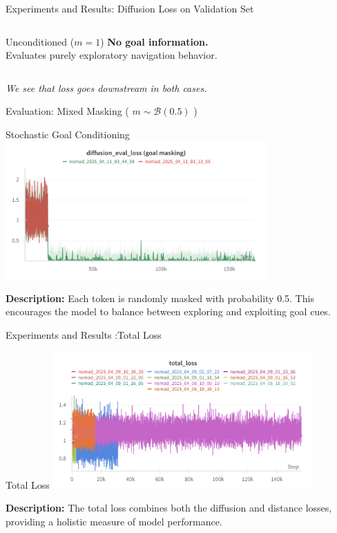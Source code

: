 \documentclass{beamer}
\begin{document}
\begin{frame}{Experiments and Results: Diffusion Loss on Validation Set}
\begin{columns}
\begin{column}{0.48\textwidth}
\begin{block}{\centering Unconditioned ($m = 1$)}
                    \vspace{0.5em}
                    \tiny \textbf{No goal information.} \\
                    Evaluates purely exploratory navigation behavior.
                \end{block}
            \end{column}
        \end{columns}
        
        \vspace{0.7em}
        \centering
        \small \textit{We see that loss goes downstream in both cases.}
    \end{frame}

    \begin{frame}{Evaluation: Mixed Masking ( $m \sim \mathcal{B}(0.5)$ )}
        \begin{block}{Stochastic Goal Conditioning}
            \centering
            \includegraphics[width=0.75\textwidth]{images/diff_eval_goal_masking.png}
            
            \vspace{0.5em}
            \small
            \textbf{Description:} 
            Each token is randomly masked with probability 0.5. This encourages the model to balance between exploring and exploiting goal cues.
        \end{block}
    \end{frame}
\begin{frame}{Experiments and Results :Total Loss}
    \begin{block}{Total Loss}
        \centering
        \includegraphics[width=0.75\textwidth]{images/totalloss_nomad.png}
        
        \vspace{0.5em}
        \small
        \textbf{Description:} 
        The total loss combines both the diffusion and distance losses, providing a holistic measure of model performance.
    \end{block}
\end{frame}
\end{document}
